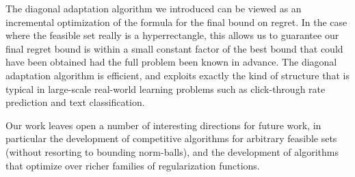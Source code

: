 The diagonal adaptation algorithm we introduced can be viewed as an
incremental optimization of the formula for the final bound on regret.
In the case where the feasible set really is a hyperrectangle, this
allows us to guarantee our final regret bound is within a small
constant factor of the best bound that could have been obtained had
the full problem been known in advance.  The diagonal adaptation
algorithm is efficient, and exploits exactly the kind of structure
that is typical in large-scale real-world learning problems such as
click-through rate prediction and text classification.

Our work leaves open a number of interesting directions for future
work, in particular the development of competitive algorithms for
arbitrary feasible sets (without resorting to bounding norm-balls),
and the development of algorithms that optimize over richer families
of regularization functions.

\begin{small}
\setlength{\itemsep}{0.5mm}


\end{small}

